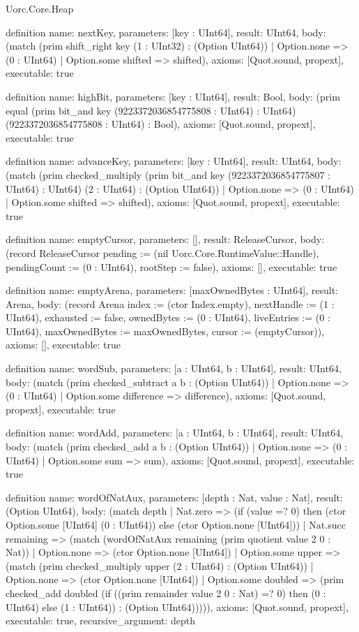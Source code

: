 \begin{lexlean}{Uorc.Core.Heap}
\begin{semanticmodule}
definition{
  name: nextKey,
  parameters: [key : UInt64],
  result: UInt64,
  body: (match (prim shift_right key (1 : UInt32) : (Option UInt64))
    | Option.none => (0 : UInt64)
    | Option.some shifted => shifted),
  axioms: [Quot.sound, propext],
  executable: true
}

definition{
  name: highBit,
  parameters: [key : UInt64],
  result: Bool,
  body: (prim equal (prim bit_and key (9223372036854775808 : UInt64) : UInt64) (9223372036854775808 : UInt64) : Bool),
  axioms: [Quot.sound, propext],
  executable: true
}

definition{
  name: advanceKey,
  parameters: [key : UInt64],
  result: UInt64,
  body: (match (prim checked_multiply (prim bit_and key (9223372036854775807 : UInt64) : UInt64) (2 : UInt64) : (Option UInt64))
    | Option.none => (0 : UInt64)
    | Option.some shifted => shifted),
  axioms: [Quot.sound, propext],
  executable: true
}

definition{
  name: emptyCursor,
  parameters: [],
  result: ReleaseCursor,
  body: (record ReleaseCursor {pending := (nil Uorc.Core.RuntimeValue::Handle), pendingCount := (0 : UInt64), rootStep := false}),
  axioms: [],
  executable: true
}

definition{
  name: emptyArena,
  parameters: [maxOwnedBytes : UInt64],
  result: Arena,
  body: (record Arena {index := (ctor Index.empty), nextHandle := (1 : UInt64), exhausted := false, ownedBytes := (0 : UInt64), liveEntries := (0 : UInt64), maxOwnedBytes := maxOwnedBytes, cursor := (emptyCursor)}),
  axioms: [],
  executable: true
}

definition{
  name: wordSub,
  parameters: [a : UInt64, b : UInt64],
  result: UInt64,
  body: (match (prim checked_subtract a b : (Option UInt64))
    | Option.none => (0 : UInt64)
    | Option.some difference => difference),
  axioms: [Quot.sound, propext],
  executable: true
}

definition{
  name: wordAdd,
  parameters: [a : UInt64, b : UInt64],
  result: UInt64,
  body: (match (prim checked_add a b : (Option UInt64))
    | Option.none => (0 : UInt64)
    | Option.some sum => sum),
  axioms: [Quot.sound, propext],
  executable: true
}

definition{
  name: wordOfNatAux,
  parameters: [depth : Nat, value : Nat],
  result: (Option UInt64),
  body: (match depth
    | Nat.zero => (if (value =? 0) then (ctor Option.some [UInt64] (0 : UInt64)) else (ctor Option.none [UInt64]))
    | Nat.succ remaining => (match (wordOfNatAux remaining (prim quotient value 2 0 : Nat))
      | Option.none => (ctor Option.none [UInt64])
      | Option.some upper => (match (prim checked_multiply upper (2 : UInt64) : (Option UInt64))
        | Option.none => (ctor Option.none [UInt64])
        | Option.some doubled => (prim checked_add doubled (if ((prim remainder value 2 0 : Nat) =? 0) then (0 : UInt64) else (1 : UInt64)) : (Option UInt64))))),
  axioms: [Quot.sound, propext],
  executable: true,
  recursive_argument: depth
}


\end{semanticmodule}
\end{lexlean}
